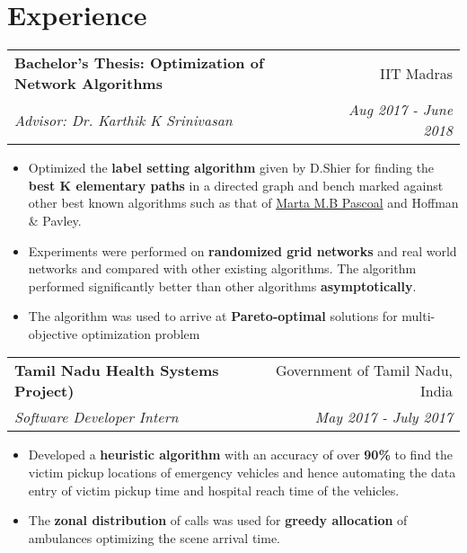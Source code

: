 \documentclass[letterpaper,11pt]{article}
\makeatletter
\newcommand{\ritem}[1]{
  \item\small{
    {#1 \vspace{-2pt}}
  }
}
\newcommand{\resumeSubheading}[4]{
  \vspace{-1pt}\item
    \begin{tabular*}{0.97\textwidth}{l@{\extracolsep{\fill}}r}
      \textbf{#1} & #2 \\
      \textit{#3} & \textit{#4} \\
    \end{tabular*}\vspace{-5pt}
}
\newcommand{\resumeSubHeadingListStart}{\begin{description}[leftmargin=*]}
\newcommand{\resumeSubHeadingListEnd}{\end{description}}
\newcommand{\resumeItemListStart}{\begin{itemize}[leftmargin=*]}
\newcommand{\resumeItemListEnd}{\end{itemize}\vspace{-4pt}}
\makeatother
\begin{document}
\section{Experience}
  \resumeSubHeadingListStart
    \resumeSubheading
      {Bachelor’s Thesis: Optimization of Network Algorithms}{IIT Madras}
      {Advisor: Dr. Karthik K Srinivasan}{Aug 2017 - June 2018}
      \resumeItemListStart
        \justifying\ritem{Optimized the \textbf{label setting algorithm} given by D.Shier for finding the \textbf{best K elementary paths} in a directed graph and bench marked against other best known algorithms such as that of \href{http://www.dis.uniroma1.it/challenge9/papers/pascoal.pdf}{Marta M.B Pascoal} and Hoffman \& Pavley.}
        \ritem{Experiments were performed on \textbf{randomized grid networks} and real world networks and compared with other existing algorithms. The algorithm performed significantly better than other algorithms \textbf{asymptotically}.}
        \justifying\ritem{The algorithm was used to arrive at \textbf{Pareto-optimal} solutions for multi-objective optimization problem}
      \resumeItemListEnd
      
    \resumeSubheading
      {Tamil Nadu Health Systems Project)}{Government of Tamil Nadu, India}
      {Software Developer Intern}{May 2017 - July 2017}
      \resumeItemListStart
        \ritem
          {Developed a \textbf{heuristic algorithm} with an accuracy of over \textbf{90\%} to find the victim pickup locations of emergency vehicles and hence automating the data entry of victim pickup time and hospital reach time of the vehicles.}
        \ritem
          {The \textbf{zonal distribution} of calls was used for \textbf{greedy allocation} of ambulances optimizing the scene arrival time.}
      \resumeItemListEnd

  \resumeSubHeadingListEnd


\end{document}
